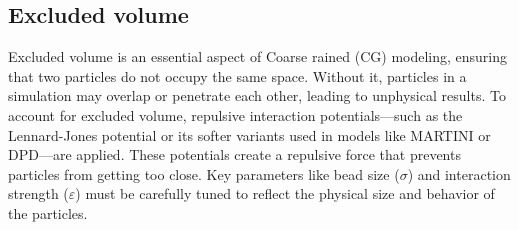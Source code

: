 \documentclass[12pt]{article}
\begin{document}
\begin{flushleft}

\vspace{-1em} 
\subsection*{Excluded volume}

Excluded volume is an essential aspect of Coarse rained (CG) modeling, ensuring that two particles do not occupy the same space. Without it, particles in a simulation may overlap or penetrate each other, leading to unphysical results. To account for excluded volume, repulsive interaction potentials—such as the Lennard-Jones potential or its softer variants used in models like MARTINI or DPD—are applied. These potentials create a repulsive force that prevents particles from getting too close. Key parameters like bead size ($\sigma$) and interaction strength ($\varepsilon$) must be carefully tuned to reflect the physical size and behavior of the particles.


\end{flushleft}
\end{document}
